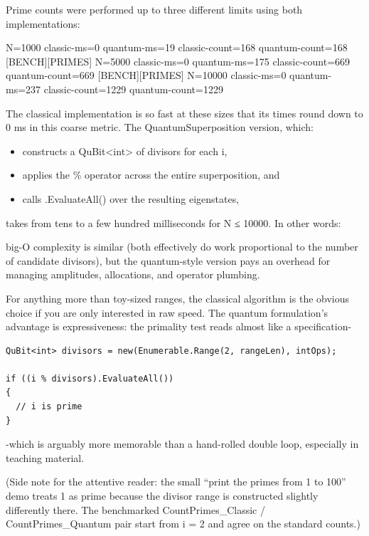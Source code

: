 \documentclass[a4paper,11pt]{article}
\begin{document}
Prime counts were performed up to three different limits using both implementations:

\begin{datadump}
[BENCH][PRIMES] N=1000 classic-ms=0 quantum-ms=19 classic-count=168 quantum-count=168
[BENCH][PRIMES] N=5000 classic-ms=0 quantum-ms=175 classic-count=669 quantum-count=669
[BENCH][PRIMES] N=10000 classic-ms=0 quantum-ms=237 classic-count=1229 quantum-count=1229
\end{datadump}

The classical implementation is so fast at these sizes that its times round down to 0 ms in this coarse metric. The QuantumSuperposition version, which:

\begin{itemize}
\item
  constructs a QuBit\textless int\textgreater{} of divisors for each i,
\item
  applies the \% operator across the entire superposition, and
\item
  calls .EvaluateAll() over the resulting eigenstates,
\end{itemize}

takes from tens to a few hundred milliseconds for N ≤ 10000. In other words:

big-O complexity is similar (both effectively do work proportional to the number of candidate divisors), but the quantum-style version pays an overhead for managing amplitudes, allocations, and operator plumbing.

For anything more than toy-sized ranges, the classical algorithm is the obvious choice if you are only interested in raw speed. The quantum formulation's advantage is expressiveness: the primality test reads almost like a specification-

\begin{lstlisting}[style=codeblock]
QuBit<int> divisors = new(Enumerable.Range(2, rangeLen), intOps);

if ((i % divisors).EvaluateAll())
{
  // i is prime
}
\end{lstlisting}

-which is arguably more memorable than a hand-rolled double loop, especially in teaching material.

(Side note for the attentive reader: the small ``print the primes from 1 to 100'' demo treats 1 as prime because the divisor range is constructed slightly differently there. The benchmarked CountPrimes\_Classic / CountPrimes\_Quantum pair start from i = 2 and agree on the standard counts.)
\end{document}
